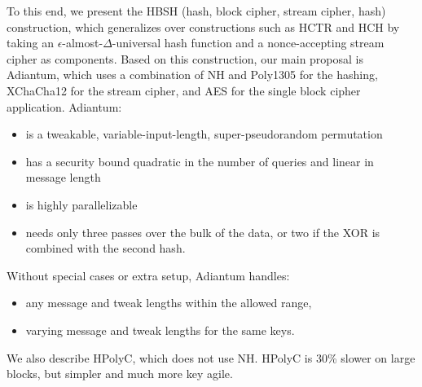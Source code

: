 \documentclass[eprint.tex]{subfiles}
\begin{document}
To this end, we present the HBSH (hash, block cipher, stream cipher, hash)
construction, which generalizes over constructions such as
HCTR and HCH by taking an $\epsilon$-almost-$\Delta$-universal hash function and a
nonce-accepting stream cipher
as components. Based on this construction, our main proposal is Adiantum,
which uses a combination of NH and Poly1305 for the hashing, XChaCha12 for the stream cipher, and
AES for the single block cipher application. Adiantum:
\begin{itemize}
    \item is a tweakable, variable-input-length, super-pseudorandom permutation
    \item has a security bound quadratic in the number of queries and linear in message length
    \item is highly parallelizable
    \item needs only three passes over the bulk of the data, or
        two if the XOR is combined with the second hash.
\end{itemize}

Without special cases or extra setup, Adiantum handles:
\begin{itemize}
    \item any message and tweak lengths within the allowed range,
    \item varying message and tweak lengths for the same keys.
\end{itemize}

We also describe HPolyC, which does not use NH.
HPolyC is 30\% slower on large blocks, but simpler and much more key agile.

\subbib
\end{document}
